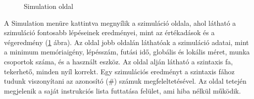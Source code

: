 \begin{figure}[h]
\centering
{}
\caption{Simulation oldal}
\label{fig:sim}
\end{figure}


A Simulation menüre kattintva megnyílik a szimuláció oldala, ahol látható a szimuláció fontosabb lépéseinek eredményei, mint az értékadások és a végeredmény (\ref{fig:sim} ábra). Az oldal jobb oldalán láthatóak a szimuláció adatai, mint a minimum memóriaigény, lépésszám, futási idő, globális és lokális méret, munka csoportok száma, és a használt eszköz. Az oldal alján látható a szintaxis fa, tekerhető, minden nyíl korrekt. Egy szimulációs eredményt a szintaxis fához tudunk viszonyítani az azonosító (\#) számuk megfeleltetésével.
Az oldal tetején megjelenik a saját instrukciós lista futtatása felület, ami hiba nélkül működik.